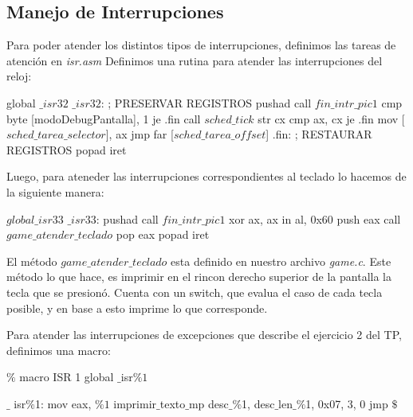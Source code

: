 \subsection{Manejo de Interrupciones}
Para poder atender los distintos tipos de interrupciones, definimos las tareas de atenci\'on en \textit{isr.asm}
Definimos una rutina para atender las interrupciones del reloj:
\begin{algorithmic}
    \State \tab global $\_isr32$
\State \tab $\_isr32$:
  \State \tab \tab; PRESERVAR REGISTROS
  \State \tab \tab pushad
  \State \tab \tab call $fin\_intr\_pic1$
  \State \tab \tab cmp byte [modoDebugPantalla], 1
  \State \tab \tab je .fin
\State \tab \tab  call $sched\_tick$
  \State \tab \tab str cx
  \State \tab \tab cmp ax, cx
  \State \tab \tab je .fin
  \State \tab \tab mov [$sched\_tarea\_selector$], ax
  \State \tab \tab jmp far [$sched\_tarea\_offset$]
\State \tab \tab .fin:
  \State \tab \tab ; RESTAURAR REGISTROS
  \State \tab \tab popad
  \State \tab \tab iret
\end{algorithmic}

Luego, para ateneder las interrupciones correspondientes al teclado lo hacemos de la siguiente manera:
\begin{algorithmic}
    \State \tab $global \_isr33$
\State \tab \tab $\_isr33$:
  \State \tab \tab pushad
  \State \tab \tab call $fin\_intr\_pic1$
  \State \tab \tab xor ax, ax
  \State \tab \tab in al, 0x60
  \State \tab \tab push eax
  \State \tab \tab call $game\_atender\_teclado$
  \State \tab \tab pop eax
  \State \tab \tab popad
  \State \tab \tab iret
\end{algorithmic}

El m\'etodo \textit{$game\_atender\_teclado$} esta definido en nuestro archivo \textit{game.c}. Este m\'etodo lo que hace, es imprimir en el rincon derecho superior de la pantalla la tecla que se presion\'o.
Cuenta con un switch, que evalua el caso de cada tecla posible, y en base a esto imprime lo que corresponde.


Para atender las interrupciones de excepciones que describe el ejercicio 2 del TP, definimos una macro:
\begin{algorithmic}
\State \tab $\%$ macro ISR 1
\State \tab global $\_$isr$\%1$

\State \tab $\_$ isr$\%$1:
    \State \tab \tab mov eax, $\%1$
    \State \tab \tab imprimir$\_$texto$\_$mp desc$\_\%$1, desc$\_$len$\_\%$1, 0x07, 3, 0
    \State \tab \tab jmp $\$$

\State \tab %
\end{algorithmic}

